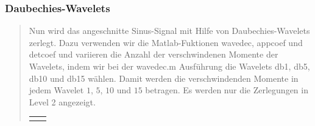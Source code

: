         \subsubsection{Daubechies-Wavelets}
        \begin{quote}
        
        Nun wird das angeschnitte Sinus-Signal mit Hilfe von Daubechies-Wavelets
        zerlegt. Dazu verwenden wir die Matlab-Fuktionen wavedec, appcoef
        und detcoef und variieren die Anzahl der verschwindenen
        Momente der Wavelets, indem wir bei der wavedec.m Ausführung die
        Wavelets db1, db5, db10 und db15 wählen. Damit werden die
        verschwindenden Momente in jedem Wavelet $1$, $5$, $10$ und $15$
        betragen. Es werden nur die Zerlegungen in Level 2 angezeigt.
        
         
        \begin{center}
                \begin{tabular}{ll}
    
                \hspace{-12em}
                    \begin{minipage}{0.6\textwidth}
    

\end{minipage}
\end{tabular}
\end{center}
\end{quote}
